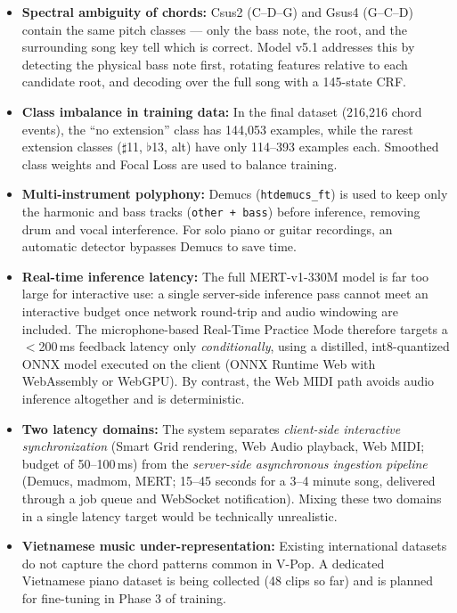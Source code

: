 \documentclass[a4paper]{article}
\begin{document}
\begin{itemize}
    \item \textbf{Spectral ambiguity of chords:} Csus2 (C--D--G) and Gsus4 (G--C--D) contain the same pitch classes --- only the bass note, the root, and the surrounding song key tell which is correct. Model v5.1 addresses this by detecting the physical bass note first, rotating features relative to each candidate root, and decoding over the full song with a 145-state CRF.
    \item \textbf{Class imbalance in training data:} In the final dataset (216,216 chord events), the ``no extension'' class has 144,053 examples, while the rarest extension classes ($\sharp$11, $\flat$13, alt) have only 114--393 examples each. Smoothed class weights and Focal Loss are used to balance training.
    \item \textbf{Multi-instrument polyphony:} Demucs (\texttt{htdemucs\_ft}) is used to keep only the harmonic and bass tracks (\texttt{other + bass}) before inference, removing drum and vocal interference. For solo piano or guitar recordings, an automatic detector bypasses Demucs to save time.
    \item \textbf{Real-time inference latency:} The full MERT-v1-330M model is far too large for interactive use: a single server-side inference pass cannot meet an interactive budget once network round-trip and audio windowing are included. The microphone-based Real-Time Practice Mode therefore targets a $<$200\,ms feedback latency only \emph{conditionally}, using a distilled, int8-quantized ONNX model executed on the client (ONNX Runtime Web with WebAssembly or WebGPU). By contrast, the Web MIDI path avoids audio inference altogether and is deterministic.
    \item \textbf{Two latency domains:} The system separates \emph{client-side interactive synchronization} (Smart Grid rendering, Web Audio playback, Web MIDI; budget of 50--100\,ms) from the \emph{server-side asynchronous ingestion pipeline} (Demucs, madmom, MERT; 15--45 seconds for a 3--4 minute song, delivered through a job queue and WebSocket notification). Mixing these two domains in a single latency target would be technically unrealistic.
    \item \textbf{Vietnamese music under-representation:} Existing international datasets do not capture the chord patterns common in V-Pop. A dedicated Vietnamese piano dataset is being collected (48 clips so far) and is planned for fine-tuning in Phase 3 of training.
\end{itemize}
\end{document}
